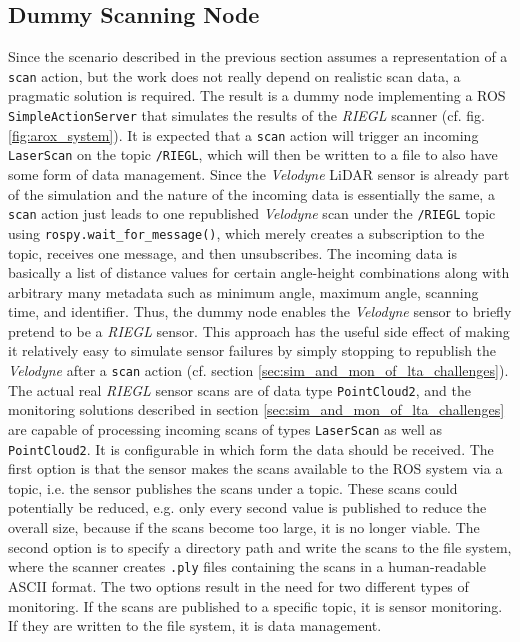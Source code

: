 \documentclass[english, master, utf8]{base/thesis_KBS}
\newcommand{\code}[1]{\colorbox{light-gray}{\texttt{#1}}}
\begin{document}
\subsection{Dummy Scanning Node}
\label{sec:dummy_scanning_node}

Since the scenario described in the previous section assumes a representation of a \code{scan} action, but the work does not really depend on realistic scan data,
a pragmatic solution is required. The result is a dummy node implementing a ROS \code{SimpleActionServer} that simulates the results of the \textit{RIEGL} scanner
(cf. fig. \ref{fig:arox_system}). It is expected that a \code{scan} action will trigger an incoming \code{LaserScan} on the topic \code{/RIEGL}, which will then be
written to a file to also have some form of data management. Since the \textit{Velodyne} LiDAR sensor is already part of the simulation and the nature of the incoming data
is essentially the same, a \code{scan} action just leads to one republished \textit{Velodyne} scan under the \code{/RIEGL} topic using \code{rospy.wait\_for\_message()},
which merely creates a subscription to the topic, receives one message, and then unsubscribes. The incoming data is basically a list of distance values for certain angle-height 
combinations along with arbitrary many metadata such as minimum angle, maximum angle, scanning time, and identifier. Thus, the dummy node enables the \textit{Velodyne} sensor
to briefly pretend to be a \textit{RIEGL} sensor. This approach has the useful side effect of making it relatively easy to simulate sensor failures by simply stopping to
republish the \textit{Velodyne} after a \code{scan} action (cf. section \ref{sec:sim_and_mon_of_lta_challenges}).\newline
The actual real \textit{RIEGL} sensor scans are of data type \code{PointCloud2}, and the monitoring solutions described in section \ref{sec:sim_and_mon_of_lta_challenges}
are capable of processing incoming scans of types \code{LaserScan} as well as \code{PointCloud2}. It is configurable in which form the data should be received. The first
option is that the sensor makes the scans available to the ROS system via a topic, i.e. the sensor publishes the scans under a topic. These scans could potentially be reduced,
e.g. only every second value is published to reduce the overall size, because if the scans become too large, it is no longer viable. The second option is to specify a 
directory path and write the scans to the file system, where the scanner creates \code{.ply} files containing the scans in a human-readable ASCII format.
The two options result in the need for two different types of monitoring. If the scans are published to a specific topic, it is sensor monitoring.
If they are written to the file system, it is data management.
\end{document}
